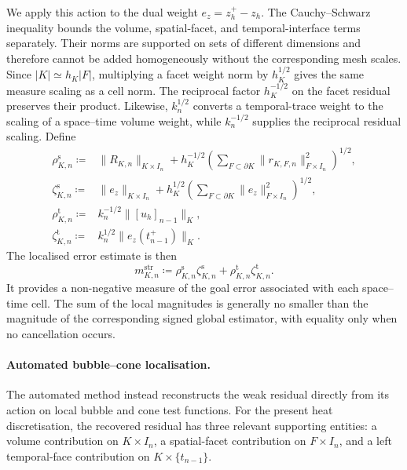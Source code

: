 We apply this action to the dual weight \(e_z=z_h^+-z_h\). The Cauchy--Schwarz inequality bounds the volume, spatial-facet, and temporal-interface terms separately. 
Their norms are supported on sets of different dimensions and therefore cannot be added homogeneously without the corresponding mesh scales. Since \(|K|\simeq h_K|F|\), multiplying a facet weight norm by \(h_K^{1/2}\) gives the same measure scaling as a cell norm. The reciprocal factor \(h_K^{-1/2}\) on the facet residual preserves their product. Likewise, \(k_n^{1/2}\) converts a temporal-trace weight to the scaling of a space--time volume weight, while \(k_n^{-1/2}\) supplies the reciprocal residual scaling. Define
\begin{subequations}
\begin{align}
\rho_{K,n}^{\mathrm{s}}
\coloneqq{}&
\lVert R_{K,n}\rVert_{K\times I_n}
+
h_K^{-1/2}
\left(
\sum_{F\subset\partial K}
\lVert r_{K,F,n}\rVert_{F\times I_n}^{2}
\right)^{1/2},
\label{eq:mh-strong-rho-one}\\
\zeta_{K,n}^{\mathrm{s}}
\coloneqq{}&
\lVert e_z\rVert_{K\times I_n}
+
h_K^{1/2}
\left(
\sum_{F\subset\partial K}
\lVert e_z\rVert_{F\times I_n}^{2}
\right)^{1/2},
\label{eq:mh-strong-zeta-one}\\
\rho_{K,n}^{\mathrm{t}}
\coloneqq{}&
k_n^{-1/2}\lVert [u_h]_{n-1}\rVert_K,\\
  \zeta_{K,n}^{\mathrm{t}}
  \coloneqq{}&
k_n^{1/2}\lVert e_z(t_{n-1}^{+})\rVert_K.
\label{eq:mh-strong-rho-zeta-two}
\end{align}
\end{subequations}
The localised error estimate is then
\begin{equation}
m_{K,n}^{\mathrm{str}}
\coloneqq
\rho_{K,n}^{\mathrm{s}}\zeta_{K,n}^{\mathrm{s}}
+
\rho_{K,n}^{\mathrm{t}}\zeta_{K,n}^{\mathrm{t}}.
\label{eq:mh-strong-score}
\end{equation}
It provides a non-negative measure of the goal error associated with each space--time cell. The sum of the local magnitudes is generally no smaller than the magnitude of the corresponding signed global estimator, with equality only when no cancellation occurs.


\paragraph{Automated bubble--cone localisation.}
The automated method instead reconstructs the weak residual directly from its action on local bubble and cone test functions. For the present heat discretisation, the recovered residual has three relevant supporting entities: a volume contribution on $K\times I_n$, a spatial-facet contribution on $F\times I_n$, and a left temporal-face contribution on $K\times\{t_{n-1}\}$. 

